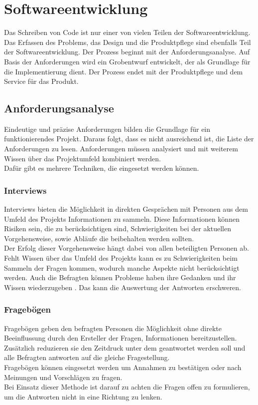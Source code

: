 \section{Softwareentwicklung}
Das Schreiben von Code ist nur einer von vielen Teilen der Softwareentwicklung. Das Erfassen des Problems, das Design und die Produktpflege sind ebenfalls Teil der Softwareentwicklung\cite{blackwell2002programming}. Der Prozess beginnt mit der Anforderungsanalyse. Auf Basis der Anforderungen wird ein Grobentwurf entwickelt, der als Grundlage für die Implementierung dient. Der Prozess endet mit der Produktpflege und dem Service für das Produkt.
\subsection{Anforderungsanalyse}
Eindeutige und präzise Anforderungen bilden die Grundlage für ein funktionierendes Projekt\cite{doi:10.1080/12460125.2016.1187390}.
Daraus folgt, dass es nicht ausreichend ist, die Liste der Anforderungen zu lesen. Anforderungen müssen analysiert und mit weiterem Wissen über das Projektumfeld kombiniert werden. \\
Dafür gibt es mehrere Techniken, die eingesetzt werden können. 
\subsubsection{Interviews}
\label{interview}
Interviews bieten die Möglichkeit in direkten Gesprächen mit Personen aus dem Umfeld des Projekts Informationen zu sammeln. Diese Informationen können Risiken sein, die zu berücksichtigen sind, Schwierigkeiten bei der aktuellen Vorgehensweise, sowie Abläufe die beibehalten werden sollten.\\
Der Erfolg dieser Vorgehensweise hängt dabei von allen beteiligten Personen ab. Fehlt Wissen über das Umfeld des Projekts kann es zu Schwierigkeiten beim Sammeln der Fragen kommen, wodurch manche Aspekte nicht berücksichtigt werden. Auch die Befragten können Probleme haben ihre Gedanken und ihr Wissen wiederzugeben \cite{tiwari2012selecting}. Das kann die Auswertung der Antworten erschweren.
\subsubsection{Fragebögen}
\label{Fragebögen}
Fragebögen geben den befragten Personen die Möglichkeit ohne direkte Beeinflussung durch den Ersteller der Fragen, Informationen bereitzustellen. Zusätzlich reduzieren sie den Zeitdruck unter dem geantwortet werden soll und alle Befragten antworten auf die gleiche Fragestellung.\\
Fragebögen können eingesetzt werden um Annahmen zu bestätigen oder nach Meinungen und Vorschlägen zu fragen\cite{tiwari2012selecting}. \\
Bei Einsatz dieser Methode ist darauf zu achten die Fragen offen zu formulieren, um die Antworten nicht in eine Richtung zu lenken. 
